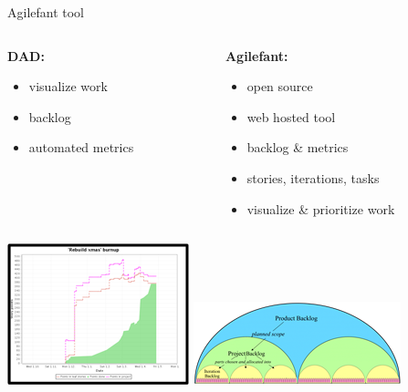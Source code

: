 \documentclass[11pt]{beamer}
\begin{document}
\begin{frame}{Agilefant tool}
	\begin{columns}
		\begin{column}[t]{5cm}
			\textbf{DAD:}
			\begin{itemize}
				\item visualize work
				\item backlog
				\item automated metrics
			\end{itemize}
		\end{column}
		\pause
		\begin{column}[t]{5cm}
			\textbf{Agilefant:}		
			\begin{itemize}
				\item open source
				\item web hosted tool
				\item backlog \& metrics
				\item stories, iterations, tasks
				\item visualize \& prioritize work		
			\end{itemize}		
		\end{column}
	\end{columns}
	\begin{center}
		\includegraphics[width=.30\linewidth]{pictures/af-metrics}
		\hspace{0.5cm}	
		\includegraphics[width=.50\linewidth]{pictures/af-elephant}
	\end{center}
		
\end{frame}
\end{document}
